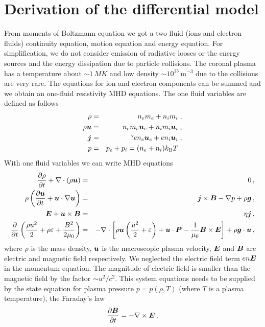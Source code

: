 \section{Derivation of the differential model}
From moments of Boltzmann equation we got a two-fluid (ions and electron fluids) continuity equation, motion equation and energy equation. For simplification,
we do not consider emission of radiative looses or the energy sources and the energy dissipation due to particle collisions. The coronal plasma has a
temperature about $\sim1\,MK$ and low density $\sim10^{15}\,\mathrm{m^{-3}}$ due to the collisions are very rare. The equations for ion and electron components
can be summed and we obtain an one-fluid resistivity MHD equations. The one fluid variables are defined as follows
\begin{eqnarray}
 \rho         &=& n_em_e + n_im_i\;, \\
 \rho \boldsymbol{u} &=& n_e m_e \boldsymbol{u}_e + n_i m_i \boldsymbol{u}_i \;,\\
 \boldsymbol{j}       &=& ?e n_e \boldsymbol{u}_e + e n_i\boldsymbol{u}_i \;,\\
 p            &=& p_e + p_i = (n_e + n_i) k_\mathrm{B} T \;.
\end{eqnarray}
With one fluid variables we can write MHD equations
\begin{eqnarray}
 \frac{\partial \rho}{\partial t}+\nabla\cdot\left(\rho\boldsymbol{u}\right) &=& 0 \,,\label{EqCont}\\
 \rho\left(\frac{\partial \boldsymbol{u}}{\partial t}+\boldsymbol{u}\cdot\nabla\boldsymbol{u}\right) &=& \boldsymbol{j}\times\boldsymbol{B}-\nabla p+\rho \boldsymbol{g} \,,\label{EqMot}\\
 \boldsymbol{E}+\boldsymbol{u}\times\boldsymbol{B} &=& \eta\boldsymbol{j}  \,,\label{EqOhm}\\
 \frac{\partial }{\partial t}\left( \frac{\rho u^2}{2}+\rho\varepsilon +\frac{B^2}{2\mu_0}\right) &=& -\nabla\cdot \left[ \rho \boldsymbol{u}\left( \frac{u^2}{2}+\varepsilon \right)+\boldsymbol{u}\cdot\boldsymbol{P}
   -\frac{1}{\mu_0}\boldsymbol{B}\times \boldsymbol{E}\right]+\rho \boldsymbol{g}\cdot\boldsymbol{u}\,,
\end{eqnarray}%
where $\rho$ is the mass density, $\boldsymbol{u}$ is the macroscopic plasma velocity, $\boldsymbol{E}$ and $\boldsymbol{B}$ are electric and magnetic field respectively. We neglected
the electric field term $e n\boldsymbol{E}$ in the momentum equation. The magnitude of electric field is smaller than the magnetic field by the factor $\sim u^2/c^2$.
This system equations needs to be supplied by the state equation for plasma pressure $p=p(\rho,T)$ (where $T$ is a plasma temperature), the Faraday's law
\begin{equation}
 \frac{\partial \boldsymbol{B}}{\partial t}=-\nabla\times \boldsymbol{E}\,,
\end{equation}
